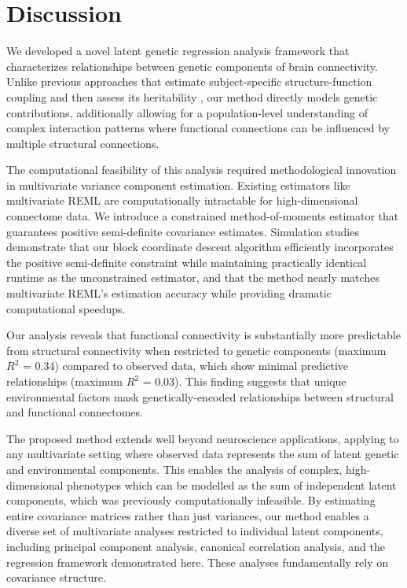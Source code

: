 \documentclass[12pt]{article}
\begin{document}
\section{Discussion}\label{sec:discussion}

We developed a novel latent genetic regression analysis framework that characterizes relationships between genetic components of brain connectivity. Unlike previous approaches that estimate subject-specific structure-function coupling and then assess its heritability \parencite{gu2021heritability}, our method directly models genetic contributions, additionally allowing for a population-level understanding of complex interaction patterns where functional connections can be influenced by multiple structural connections.

The computational feasibility of this analysis required methodological innovation in multivariate variance component estimation. Existing estimators like multivariate REML are computationally intractable for high-dimensional connectome data. We introduce a constrained method-of-moments estimator that guarantees positive semi-definite covariance estimates. Simulation studies demonstrate that our block coordinate descent algorithm efficiently incorporates the positive semi-definite constraint while maintaining practically identical runtime as the unconstrained estimator, and that the method nearly matches multivariate REML's estimation accuracy while providing dramatic computational speedups.

Our analysis reveals that functional connectivity is substantially more predictable from structural connectivity when restricted to genetic components (maximum $R^2$ = 0.34) compared to observed data, which show minimal predictive relationships (maximum $R^2$ = 0.03). This finding suggests that unique environmental factors mask genetically-encoded relationships between structural and functional connectomes.

The proposed method extends well beyond neuroscience applications, applying to any multivariate setting where observed data represents the sum of latent genetic and environmental components. This enables the analysis of complex, high-dimensional phenotypes which can be modelled as the sum of independent latent components, which was previously computationally infeasible. By estimating entire covariance matrices rather than just variances, our method enables a diverse set of multivariate analyses restricted to individual latent components, including principal component analysis, canonical correlation analysis, and the regression framework demonstrated here. These analyses fundamentally rely on covariance structure.
\end{document}
